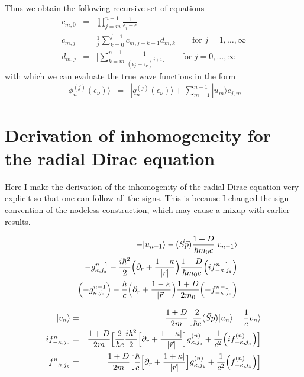 \documentclass[11pt,a4paper]{report}
\begin{document}
Thus we obtain the following recursive set of equations
\begin{eqnarray}
c_{m,0}&=&\prod_{j=m}^{n-1}\frac{1}{\epsilon_j-\epsilon}
\\
c_{m,j}&=&\frac{1}{j}\sum_{k=0}^{j-1}  c_{m,j-k-1}d_{m,k}
\qquad\text{for $j=1,\ldots,\infty$}
\nonumber\\
d_{m,j}&=&
\biggl[\sum_{k=m}^{n-1}\frac{1}{(\epsilon_j-\epsilon_\nu)^{j+1}}\biggr]
\qquad\text{for $j=0,\ldots,\infty$}
\end{eqnarray}
with which we can evaluate the true wave functions in the form
\begin{eqnarray}
|\phi_n^{(j)}(\epsilon_\nu)\rangle
&=&
|q_n^{(j)}(\epsilon_\nu)\rangle+\sum_{m=1}^{n-1}|u_m\rangle c_{j,m}
\end{eqnarray}

\chapter{Derivation of inhomogeneity for the radial Dirac equation}
\label{app:inhomraddirac}
Here I make the derivation of the inhomogenity of the radial Dirac
equation very explicit so that one can follow all the signs. This is
because I changed the sign convention of the nodeless construction,
which may cause a mixup with earlier results.

\begin{eqnarray}
&&-|u_{n-1}\rangle-(\vec{S}\vec{p})\frac{1+D}{\hbar m_0c}|v_{n-1}\rangle
\nonumber\\
&&
-g_{\kappa,j_z}^{n-1}-\frac{i\hbar^2}{2}
\Bigl(\partial_r+\frac{1-\kappa}{|\vec{r}|}\Bigr)\frac{1+D}{\hbar m_0c} 
\Bigl(if_{-\kappa,j_z}^{n-1}\Bigr)
\nonumber\\
&&\Bigl(-g_{\kappa,j_z}^{n-1}\Bigr)-\frac{\hbar}{c}
\Bigl(\partial_r+\frac{1-\kappa}{|\vec{r}|}\Bigr)\frac{1+D}{2m_0} 
\Bigl(-f_{-\kappa,j_z}^{n-1}\Bigr)
\end{eqnarray}

\begin{eqnarray}
|v_n\rangle&=&\frac{1+D}{2m}
\Bigl[\frac{2}{\hbar c}(\vec{S}\vec{p})|u_n\rangle+\frac{1}{c}v_n\rangle
\nonumber\\
if_{-\kappa,j_z}^{n}&=&\frac{1+D}{2m}
\Bigl[\frac{2}{\hbar c}\frac{i\hbar^2}{2}
\Bigl[\partial_r+\frac{1+\kappa|}{|\vec{r}|}\Bigr]
g_{\kappa,j_z}^{(n)}
+\frac{1}{c^2}\Bigl(if_{-\kappa,j_z}^{(n)}\Bigr)\Bigr]
\nonumber\\
f_{-\kappa,j_z}^{n}&=&\frac{1+D}{2m}
\Bigl[\frac{\hbar}{c}
\Bigl[\partial_r+\frac{1+\kappa|}{|\vec{r}|}\Bigr]
g_{\kappa,j_z}^{(n)}
+\frac{1}{c^2}\Bigl(f_{-\kappa,j_z}^{(n)}\Bigr)\Bigr]
\nonumber\\
\end{eqnarray}
\end{document}
